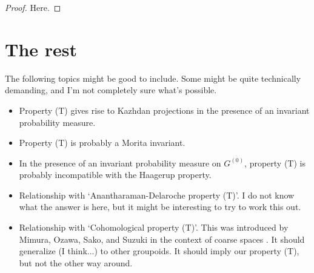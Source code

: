 \documentclass{article}
\newcommand{\R}{\mathbb{R}}
\newcommand{\h}{\mathcal{H}}
\theoremstyle{plain}
\newtheorem{proposition}[theorem]{Proposition}
\theoremstyle{definition}
\theoremstyle{remark}
\begin{document}
\begin{proof}
Here.
\end{proof}












\section{The rest}

The following topics might be good to include.  Some might be quite technically demanding, and I'm not completely sure what's possible.

\begin{itemize}
\item Property (T) gives rise to Kazhdan projections in the presence of an invariant probability measure.
\item Property (T) is probably a Morita invariant.  
\item In the presence of an invariant probability measure on $G^{(0)}$, property (T) is probably incompatible with the Haagerup property.
\item Relationship with `Anantharaman-Delaroche property (T)'.  I do not know what the answer is here, but it might be interesting to try to work this out.
\item Relationship with `Cohomological property (T)'.  This was introduced by Mimura, Ozawa, Sako, and Suzuki in the context of coarse spaces \cite[Section 6]{Mimura:2014uq}.  It should generalize (I think...) to other groupoids.  It should imply our property (T), but not the other way around.  
\end{itemize}












\end{document}
